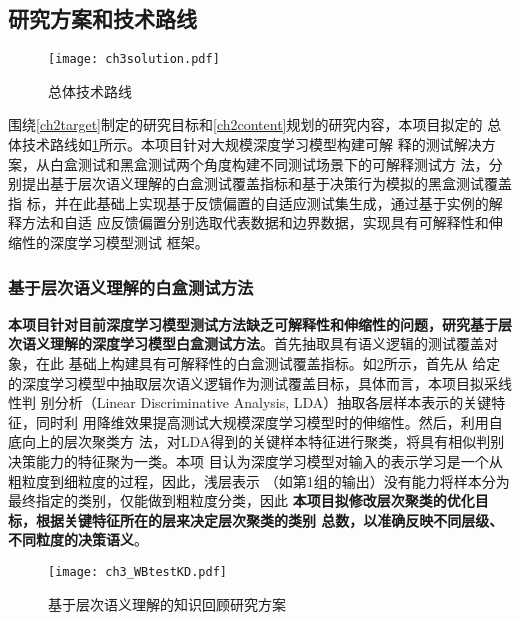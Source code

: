 \subsection{研究方案和技术路线}

\begin{figure}[h]
    \begin{small}
        \begin{center}
            \texttt{[image: ch3solution.pdf]}
        \end{center}
        \caption{总体技术路线}
        \label{fig:ch3:solution}
    \end{small}
\end{figure}

围绕\ref{ch2target}制定的研究目标和\ref{ch2content}规划的研究内容，本项目拟定的
总体技术路线如\cref{fig:ch3:solution}所示。本项目针对大规模深度学习模型构建可解
释的测试解决方案，从白盒测试和黑盒测试两个角度构建不同测试场景下的可解释测试方
法，分别提出基于层次语义理解的白盒测试覆盖指标和基于决策行为模拟的黑盒测试覆盖指
标，并在此基础上实现基于反馈偏置的自适应测试集生成，通过基于实例的解释方法和自适
应反馈偏置分别选取代表数据和边界数据，实现具有可解释性和伸缩性的深度学习模型测试
框架。

\subsubsection{基于层次语义理解的白盒测试方法}\label{ch3_2}

\textbf{本项目针对目前深度学习模型测试方法缺乏可解释性和伸缩性的问题，研究基于层
次语义理解的深度学习模型白盒测试方法}。首先抽取具有语义逻辑的测试覆盖对象，在此
基础上构建具有可解释性的白盒测试覆盖指标。如\cref{fig:ch3:WBtestKD}所示，首先从
给定的深度学习模型中抽取层次语义逻辑作为测试覆盖目标，具体而言，本项目拟采线性判
别分析（Linear Discriminative Analysis, LDA）抽取各层样本表示的关键特征，同时利
用降维效果提高测试大规模深度学习模型时的伸缩性。然后，利用自底向上的层次聚类方
法，对LDA得到的关键样本特征进行聚类，将具有相似判别决策能力的特征聚为一类。本项
目认为深度学习模型对输入的表示学习是一个从粗粒度到细粒度的过程，因此，浅层表示
（如第1组的输出）没有能力将样本分为最终指定的类别，仅能做到粗粒度分类，因此
\textbf{本项目拟修改层次聚类的优化目标，根据关键特征所在的层来决定层次聚类的类别
总数，以准确反映不同层级、不同粒度的决策语义}。

\begin{figure}[htp]
    \begin{small}
        \begin{center}
            \texttt{[image: ch3\_WBtestKD.pdf]}
        \end{center}
        \caption{基于层次语义理解的知识回顾研究方案}
        \label{fig:ch3:WBtestKD}
    \end{small}
\end{figure}

